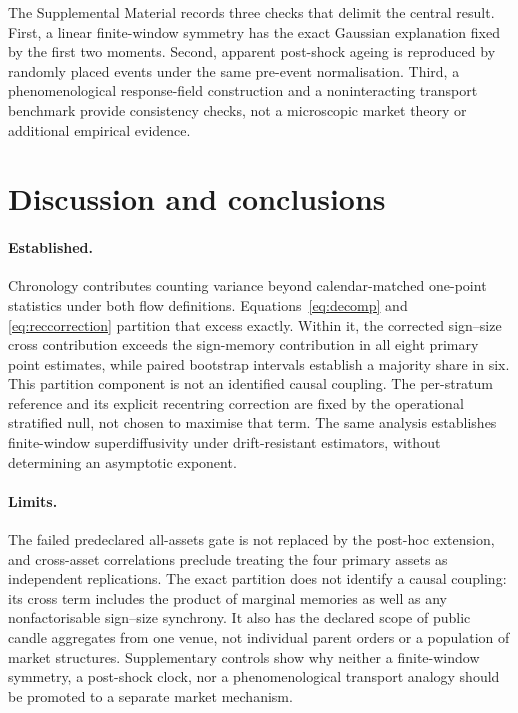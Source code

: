 \documentclass[aps,pre,twocolumn,superscriptaddress,floatfix,nofootinbib]{revtex4-2}
\begin{document}
The Supplemental Material \cite{supplement} records three checks that delimit
the central result. First, a linear finite-window symmetry has the exact
Gaussian explanation fixed by the first two moments. Second, apparent
post-shock ageing is reproduced by randomly placed events under the same
pre-event normalisation. Third, a phenomenological response-field construction
and a noninteracting transport benchmark provide consistency checks, not a
microscopic market theory or additional empirical evidence.

\section{Discussion and conclusions}
\label{sec:integrated-discussion}

\paragraph*{Established.}
Chronology contributes counting variance beyond calendar-matched one-point
statistics under both flow definitions. Equations~\eqref{eq:decomp} and
\eqref{eq:reccorrection} partition that excess exactly. Within it, the
corrected sign--size cross contribution exceeds the sign-memory contribution
in all eight primary point estimates, while paired bootstrap intervals
establish a majority share in six. This partition component is not an
identified causal coupling.
The per-stratum reference and its explicit recentring correction are fixed by
the operational stratified null, not chosen to maximise that term. The same analysis establishes
finite-window superdiffusivity under drift-resistant estimators, without
determining an asymptotic exponent.

\paragraph*{Limits.}
The failed predeclared all-assets gate is not replaced by the post-hoc
extension, and cross-asset correlations preclude treating the four primary
assets as independent replications. The exact partition does not identify a
causal coupling: its cross term includes the product of marginal memories as
well as any nonfactorisable sign--size synchrony. It also has the declared
scope of public candle aggregates from one venue, not individual parent orders
or a population of market structures. Supplementary controls show why neither
a finite-window symmetry, a post-shock clock, nor a phenomenological transport
analogy should be promoted to a separate market mechanism.
\end{document}
